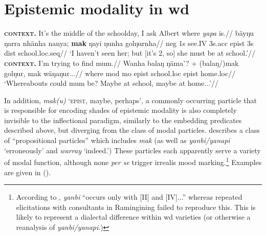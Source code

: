 \fi

	\iffalse
		The entries i had in the FoDS talk (definitely don't get it right):
		
		
		\gls{II} as modal-for-the-present
		
		
		$$\llbracket \gls{II}(\varphi)\rrbracket^{w,t*,\textbf{\textsc{mb}}}\leftrightarrow\forall w^\prime\in \textsc{\textbf{mb}}(w,t*)[t*\preceq t^\prime\wedge\varphi(w^\prime,t^\prime)] $$
		\textit{$ \varphi $ holds at or after speech time in all worlds that are \textbf{mb-}accessible from $ w $}
		
		\gls{IV} as modal-for-the-past
		
		
		$$\llbracket\gls{IV}(\varphi)\rrbracket^{w,t*,\textbf{\textsc{mb}}}\leftrightarrow\forall w^\prime\in \textsc{\textbf{mb}}(w,t*)[t*\succ t^\prime\wedge\varphi(w^\prime,t^\prime)] $$
		\textit{$ \varphi $ holds before speech time in all worlds that are \textbf{mb-}accessible from $ w $}
	\fi
	
	
	
	
	\section{Epistemic modality in \gls{wd}}
	\pex\a\begingl\glpreamble\textbf{\textsc{context}.} It's the middle of the schoolday, I ask Albert where \textit{yapa} is.//
	\gla bäyŋu ŋarra nhänha nanya; \textbf{mak} ŋayi ŋunha golŋurnha//
	\glb \gls{neg} 1s see.\gls{IV} 3s.\gls{acc} \gls{epist} 3s \gls{dist} school.\gls{loc}.\gls{seq}//
	\glft`I haven't seen her; but [it's 2, so] she must be at school.'\trailingcitation{[AW~20190429]}//\endgl
	\a\begingl\glpreamble\textbf{\textsc{context.}} I'm trying to find mum.//
	\gla Wanha balaŋ ŋäma'? + (balaŋ/)mak golŋur, mak wäŋaŋur...//
	\glb where \gls{mod} \gls{mo} \gls{epist} school.\gls{loc} \gls{epist} home.\gls{loc}//
	\glft`Whereabouts could mum be? Maybe at school, maybe at home...'//\endgl
	\xe
	
	
	
	In addition, \textit{mak(u)} `\textsc{epist, }maybe, perhaps', a commonly occurring particle that is responsible for encoding shades of epistemic modality is also completely invisible to the inflectional paradigm, similarly to the embedding predicates described above, but diverging from the class of modal particles. \citet[685]{Wilkinson1991} describes a class of ``propositional particles'' which includes \textit{mak} (as well as \textit{yanbi\slash{}yanapi} `erroneously' and \textit{warray} `indeed.') These particles each apparently serve a variety of modal function, although none \textit{per se} trigger irrealis mood marking.\footnote{According to \citet[686]{Wilkinson1991}, \textit{yanbi} ``occurs only with [\gls{II}] and [\gls{IV}]...'' whereas repeated elicitations with consultants in Ramingining failed to reproduce this. This is likely to represent a dialectal difference within \gls{wd} varieties (or otherwise a reanalysis of \textit{yanbi\slash{}yanapi}.)} Examples are given in ().
	
